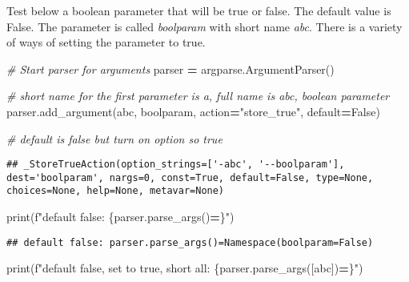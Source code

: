 \documentclass[
]{book}
\newenvironment{Shaded}{\begin{snugshade}}{\end{snugshade}}
\newcommand{\BuiltInTok}[1]{#1}
\newcommand{\CommentTok}[1]{\textcolor[rgb]{0.56,0.35,0.01}{\textit{#1}}}
\newcommand{\NormalTok}[1]{#1}
\newcommand{\OperatorTok}[1]{\textcolor[rgb]{0.81,0.36,0.00}{\textbf{#1}}}
\newcommand{\SpecialCharTok}[1]{\textcolor[rgb]{0.00,0.00,0.00}{#1}}
\newcommand{\SpecialStringTok}[1]{\textcolor[rgb]{0.31,0.60,0.02}{#1}}
\newcommand{\StringTok}[1]{\textcolor[rgb]{0.31,0.60,0.02}{#1}}
\newcommand{\VariableTok}[1]{\textcolor[rgb]{0.00,0.00,0.00}{#1}}
\begin{document}
Test below a boolean parameter that will be true or false. The default value is False. The parameter is called \emph{boolparam} with short name \emph{abc}. There is a variety of ways of setting the parameter to true.

\begin{Shaded}
\begin{Highlighting}[]
\CommentTok{\# Start parser for arguments}
\NormalTok{parser }\OperatorTok{=}\NormalTok{ argparse.ArgumentParser()}

\CommentTok{\# short name for the first parameter is a, full name is abc, boolean parameter}
\NormalTok{parser.add\_argument(}\StringTok{\textquotesingle{}{-}abc\textquotesingle{}}\NormalTok{, }\StringTok{\textquotesingle{}{-}{-}boolparam\textquotesingle{}}\NormalTok{, action}\OperatorTok{=}\StringTok{"store\_true"}\NormalTok{, default}\OperatorTok{=}\VariableTok{False}\NormalTok{)}

\CommentTok{\# default is false but turn on option so true}
\end{Highlighting}
\end{Shaded}

\begin{verbatim}
## _StoreTrueAction(option_strings=['-abc', '--boolparam'], dest='boolparam', nargs=0, const=True, default=False, type=None, choices=None, help=None, metavar=None)
\end{verbatim}

\begin{Shaded}
\begin{Highlighting}[]
\BuiltInTok{print}\NormalTok{(}\SpecialStringTok{f"default false: }\SpecialCharTok{\{}\NormalTok{parser}\SpecialCharTok{.}\NormalTok{parse\_args()}\OperatorTok{=}\SpecialCharTok{\}}\SpecialStringTok{"}\NormalTok{)}
\end{Highlighting}
\end{Shaded}

\begin{verbatim}
## default false: parser.parse_args()=Namespace(boolparam=False)
\end{verbatim}

\begin{Shaded}
\begin{Highlighting}[]
\BuiltInTok{print}\NormalTok{(}\SpecialStringTok{f"default false, set to true, short all: }\SpecialCharTok{\{}\NormalTok{parser}\SpecialCharTok{.}\NormalTok{parse\_args([}\StringTok{\textquotesingle{}{-}abc\textquotesingle{}}\NormalTok{])}\OperatorTok{=}\SpecialCharTok{\}}\SpecialStringTok{"}\NormalTok{)}
\end{Highlighting}
\end{Shaded}
\end{document}
